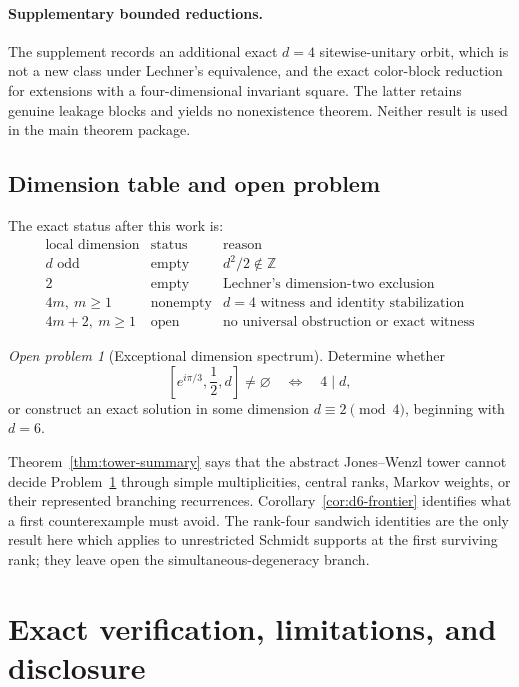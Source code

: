 \documentclass[11pt]{article}
\theoremstyle{definition}
\theoremstyle{remark}
\newtheorem{problem}[theorem]{Open problem}
\begin{document}
\paragraph{Supplementary bounded reductions.}
The supplement records an additional exact \(d=4\) sitewise-unitary
orbit, which is not a new class under Lechner's equivalence, and the exact
color-block reduction for extensions with a four-dimensional invariant
square. The latter retains genuine leakage blocks and yields no
nonexistence theorem. Neither result is used in the main theorem package.

\subsection{Dimension table and open problem}
\label{sec:open-problem}

The exact status after this work is:
\[
\begin{array}{c|c|l}
\text{local dimension}&\text{status}&\text{reason}\\ \hline
d\text{ odd}&\text{empty}&d^2/2\notin\mathbb Z\\
2&\text{empty}&\text{Lechner's dimension-two exclusion}\\
4m,\ m\ge1&\text{nonempty}&d=4\text{ witness and identity stabilization}\\
4m+2,\ m\ge1&\text{open}&\text{no universal obstruction or exact witness}
\end{array}
\]

\begin{problem}[Exceptional dimension spectrum]
\label{prob:spectrum}
Determine whether
\[
 \left[e^{i\pi/3},\frac12,d\right]\ne\varnothing
 \quad\Longleftrightarrow\quad 4\mid d,
\]
or construct an exact solution in some dimension
\(d\equiv2\pmod4\), beginning with \(d=6\).
\end{problem}

Theorem~\ref{thm:tower-summary} says that the abstract Jones--Wenzl tower
cannot decide Problem~\ref{prob:spectrum} through simple multiplicities,
central ranks, Markov weights, or their represented branching recurrences.
Corollary~\ref{cor:d6-frontier} identifies what a first counterexample must
avoid. The rank-four sandwich identities are the only result here which
applies to unrestricted Schmidt supports at the first surviving rank; they
leave open the simultaneous-degeneracy branch.

\section{Exact verification, limitations, and disclosure}
\label{sec:verification}
\end{document}
